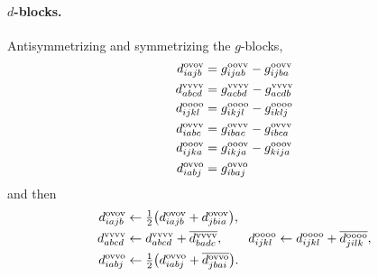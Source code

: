\documentclass[11pt]{article}
\begin{document}
\paragraph{$d$-blocks.} Antisymmetrizing and symmetrizing the $g$-blocks,
\begin{align*}
  d^{\rm ovov}_{iajb} &=  g^{\rm oovv}_{ijab} - g^{\rm oovv}_{ijba} \\
  d^{\rm vvvv}_{abcd} &=  g^{\rm vvvv}_{acbd} - g^{\rm vvvv}_{acdb} \\
  d^{\rm oooo}_{ijkl} &=  g^{\rm oooo}_{ikjl} - g^{\rm oooo}_{iklj} \\
  d^{\rm ovvv}_{iabc} &=  g^{\rm ovvv}_{ibac} - g^{\rm ovvv}_{ibca} \\
  d^{\rm ooov}_{ijka} &=  g^{\rm ooov}_{ikja} - g^{\rm ooov}_{kija} \\
  d^{\rm ovvo}_{iabj} &=  g^{\rm ovvo}_{ibaj}
\end{align*}
and then
\begin{align*}
 d^{\rm ovov}_{iajb}&\leftarrow\tfrac12\big(d^{\rm ovov}_{iajb}+d^{\rm ovov}_{jbia}\big),\\
 d^{\rm vvvv}_{abcd}&\leftarrow d^{\rm vvvv}_{abcd}+\overline{d^{\rm vvvv}_{badc}},\qquad
 d^{\rm oooo}_{ijkl}\leftarrow d^{\rm oooo}_{ijkl}+\overline{d^{\rm oooo}_{jilk}},\\
 d^{\rm ovvo}_{iabj}&\leftarrow\tfrac12\big(d^{\rm ovvo}_{iabj}+\overline{d^{\rm ovvo}_{jbai}}\big).
\end{align*}
\end{document}
